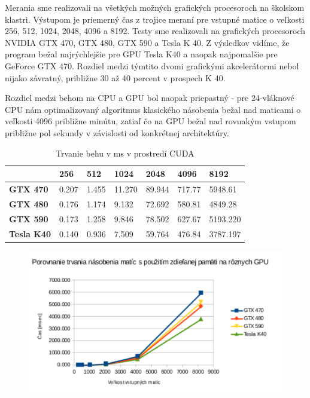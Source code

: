 \documentclass[slovak]{article}
\begin{document}
Merania sme realizovali na všetkých možných grafických procesoroch na školskom klastri. Výstupom je priemerný čas z trojice meraní pre vstupné matice o veľkosti 256, 512, 1024, 2048, 4096 a 8192. Testy sme realizovali na grafických procesoroch NVIDIA GTX 470, GTX 480, GTX 590 a Tesla K 40. Z výsledkov vidíme, že program bežal najrýchlejšie pre GPU Tesla K40 a naopak najpomalšie pre GeForce GTX 470. Rozdiel medzi týmtito dvomi grafickými akcelerátormi nebol nijako závratný, približne 30 až 40 percent v prospech K 40.

Rozdiel medzi behom na CPU a GPU bol naopak priepastný - pre 24-vláknové CPU nám optimalizovaný algoritmus klasického násobenia bežal nad maticami o veľkosti 4096 približne minútu, zatiaľ čo na GPU bežal nad rovnakým vstupom približne pol sekundy v závislosti od konkrétnej architektúry.

\begin{table}\centering
	\begin{tabularx}{\textwidth}{ | X | X | X | X | X | X | X | }
	  \hline                       
				& \textbf{256} 	& \textbf{512} 	& \textbf{1024} 	& \textbf{2048} 	& \textbf{4096} 	& \textbf{8192} 		\\ \hline
	  \textbf{GTX 470} 	& 0.207 & 1.455 & 11.270& 89.944& 717.77& 5948.61	\\ \hline
	  \textbf{GTX 480} 	& 0.176 & 1.174	& 9.132	& 72.692& 580.81& 4849.28	\\ \hline
	  \textbf{GTX 590} 	& 0.173 & 1.258 & 9.846 & 78.502& 627.67& 5193.220	\\ \hline
	  \textbf{Tesla K40} & 0.140 & 0.936 & 7.509 & 59.764& 476.84& 3787.197  \\ \hline
	\end{tabularx}
\caption{Trvanie behu v ms v prostredí CUDA}
\label{tab2}
\end{table}

\begin{figure}\centering
	\includegraphics[scale=1]{./images/gpu.pdf}
	\label{gr:graf7}
\end{figure}  
\end{document}
